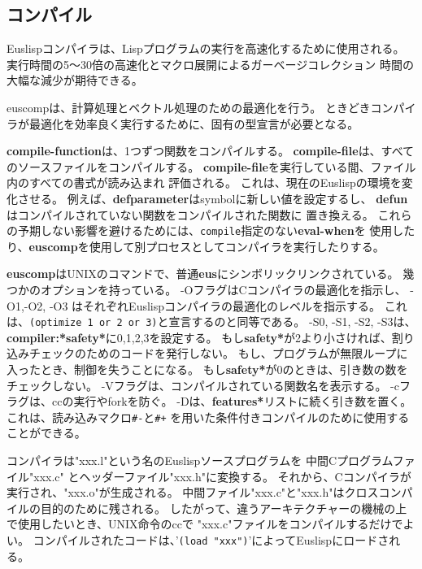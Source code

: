 \begin{refdesc}

\end{refdesc}

\newpage


\subsection{コンパイル}\label{compiler}

Euslispコンパイラは、Lispプログラムの実行を高速化するために使用される。
実行時間の5〜30倍の高速化とマクロ展開によるガーベージコレクション
時間の大幅な減少が期待できる。

euscompは、計算処理とベクトル処理のための最適化を行う。
ときどきコンパイラが最適化を効率良く実行するために、固有の型宣言が必要となる。

{\bf compile-function}は、1つずつ関数をコンパイルする。
{\bf compile-file}は、すべてのソースファイルをコンパイルする。
{\bf compile-file}を実行している間、ファイル内のすべての書式が読み込まれ
評価される。
これは、現在のEuslispの環境を変化させる。
例えば、{\bf defparameter}はsymbolに新しい値を設定するし、
{\bf defun}はコンパイルされていない関数をコンパイルされた関数に
置き換える。
これらの予期しない影響を避けるためには、{\tt compile}指定のない{\bf eval-when}を
使用したり、{\bf euscomp}を使用して別プロセスとしてコンパイラを実行したりする。

{\bf euscomp}はUNIXのコマンドで、普通{\bf eus}にシンボリックリンクされている。
幾つかのオプションを持っている。
-OフラグはCコンパイラの最適化を指示し、
-O1,-O2, -O3 はそれぞれEuslispコンパイラの最適化のレベルを指示する。
これは、{\tt (optimize 1 or 2 or 3)}と宣言するのと同等である。
-S0, -S1, -S2, -S3は、{\bf compiler:*safety*}に0,1,2,3を設定する。
もし{\bf *safety*}が2より小さければ、割り込みチェックのためのコードを発行しない。
もし、プログラムが無限ループに入ったとき、制御を失うことになる。
もし{\bf *safety*}が0のときは、引き数の数をチェックしない。
-Vフラグは、コンパイルされている関数名を表示する。
-cフラグは、ccの実行やforkを防ぐ。
-Dは、{\bf *features*}リストに続く引き数を置く。
これは、読み込みマクロ{\tt \#-}と{\tt \#+}
を用いた条件付きコンパイルのために使用することができる。

コンパイラは"xxx.l"という名のEuslispソースプログラムを
中間Cプログラムファイル"xxx.c"
とヘッダーファイル"xxx.h"に変換する。
それから、Cコンパイラが実行され、"xxx.o"が生成される。
中間ファイル"xxx.c"と"xxx.h"はクロスコンパイルの目的のために残される。
したがって、違うアーキテクチャーの機械の上で使用したいとき、UNIX命令のccで
"xxx.c"ファイルをコンパイルするだけでよい。
コンパイルされたコードは、'{\tt (load "xxx")}'によってEuslispにロードされる。

